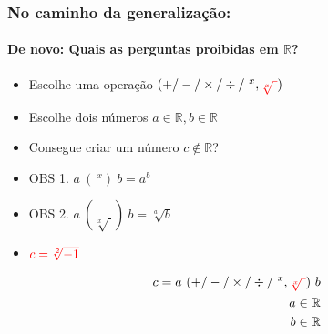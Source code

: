 \documentclass[usenames,dvipsnames,svgnames]{beamer}
\begin{document}
\begin{frame}	
	\frametitle{No caminho da generalização:}
	\framesubtitle{De novo: Quais as perguntas proibidas em $\mathbb{R}$?}

	\begin{itemize}
		\item Escolhe uma operação $(+ / - / \times / \div / ~^x, {\color{red}\sqrt[x]{~}})$
		\item Escolhe dois números $a \in \mathbb{R}, b \in \mathbb{R}$
		\item Consegue criar um número $c \not \in \mathbb{R}$?
		\item OBS 1. $a ~(~^x)~ b = a^b$
		\item OBS 2. $a ~(\sqrt[x]{~})~ b = \sqrt[a]{b}$
		\item ${\color{red}c = \sqrt[2]{-1}}$
	\end{itemize}

	\begin{equation}
	\begin{aligned}
		c = a ~ (+ / - / \times / \div / ~^x, {\color{red}\sqrt[x]{~}}) ~ b \\
		a \in \mathbb{R} \\
		b \in \mathbb{R}
	\end{aligned}
	\end{equation}

\end{frame}
\end{document}
